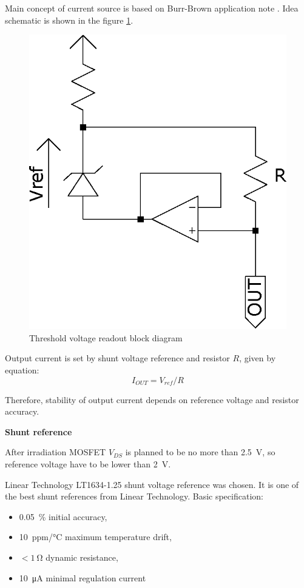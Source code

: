         Main concept of current source is based on Burr-Brown application note \cite{Make_a_precision_current_source_or_sink}. Idea schematic is shown in the figure \ref{current_source_schematic}.

        \begin{figure}[H]
            \centering
            \includegraphics[width=0.3\paperwidth]{img/06/current_source_schematic.eps}
            \caption{Threshold voltage readout block diagram}
            \label{current_source_schematic}
        \end{figure}

        Output current is set by shunt voltage reference and resistor $R$, given by equation:
        $$I_{OUT} = V_{ref}/R$$

        Therefore, stability of output current depends on reference voltage and resistor accuracy.

        \bigskip \textbf{Shunt reference}

        After irradiation MOSFET $V_{DS}$ is planned to be no more than \SI{2.5}{\volt}, so reference voltage have to be lower than \SI{2}{\volt}.

        Linear Technology LT1634-1.25 shunt voltage reference was chosen. It is one of the best shunt references from Linear Technology. Basic specification:
        \begin{itemize}
            \item \SI{0.05}{\percent} initial accuracy,
            \item \SI{10}{ppm/\degreeCelsius} maximum temperature drift,
            \item $< \SI{1}{\ohm}$ dynamic resistance,
            \item \SI{10}{\uA} minimal regulation current
        \end{itemize}

